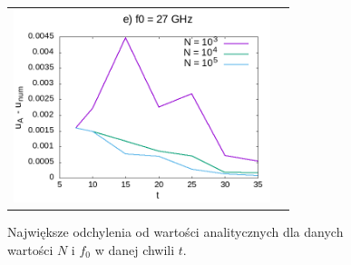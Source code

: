\documentclass[11pt,a4paper]{report}
\begin{document}
\begin{figure}
\begin{tabular}{cc}
  \includegraphics[width=75mm]{zad4/zad4_27} & \\
\end{tabular}
\caption{Największe odchylenia od wartości analitycznych dla danych wartości $N$ i $f_0$ w danej chwili $t$.}
\end{figure}
\newpage
\end{document}
